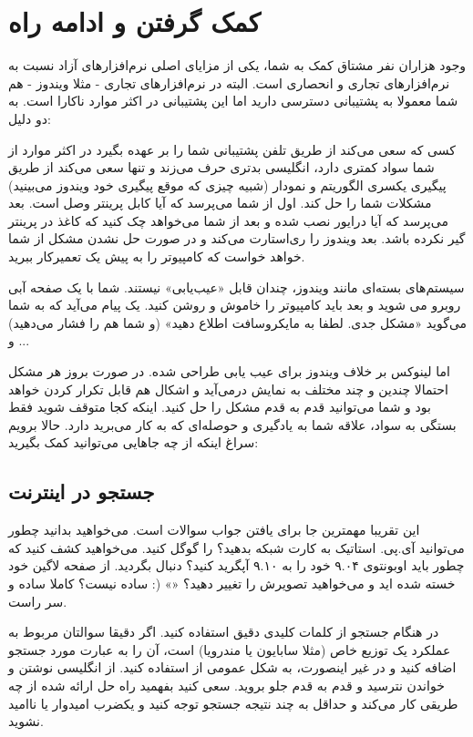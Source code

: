 \section{کمک گرفتن و ادامه راه}
وجود هزاران نفر مشتاق کمک به شما، یکی از مزایای اصلی نرم‌افزارهای آزاد نسبت به نرم‌افزارهای تجاری و انحصاری است. البته در نرم‌افزارهای تجاری - مثلا ویندوز - هم شما معمولا به پشتیبانی دسترسی دارید اما این پشتیبانی در اکثر موارد ناکارا است. به دو دلیل:

کسی که سعی می‌کند از طریق تلفن پشتیبانی شما را بر عهده بگیرد در اکثر موارد از شما سواد کمتری دارد، انگلیسی بدتری حرف می‌زند و تنها سعی می‌کند از طریق پیگیری یکسری الگوریتم و نمودار (شبیه چیزی که موقع پیگیری 
 خود ویندوز می‌بینید) مشکلات شما را حل کند. اول از شما می‌پرسد که آیا کابل پرینتر وصل است. بعد می‌پرسد که آیا درایور نصب شده و بعد از شما می‌خواهد چک کنید که کاغذ در پرینتر گیر نکرده باشد. بعد ویندوز را ری‌استارت می‌کند و در صورت حل نشدن مشکل از شما خواهد خواست که کامپیوتر را به پیش یک تعمیرکار ببرید.

سیستم‌های بسته‌ای مانند ویندوز، چندان قابل «عیب‌یابی» نیستند. شما با یک صفحه آبی روبرو می شوید و بعد باید کامپیوتر را خاموش و روشن کنید. یک پیام می‌آید که به شما می‌گوید «مشکل جدی. لطفا به مایکروسافت اطلاع دهید» (و شما هم 
را فشار می‌دهید) و ...

اما لینوکس بر خلاف ویندوز برای عیب یابی طراحی شده. در صورت بروز هر مشکل احتمالا چندین و چند 
مختلف به نمایش درمی‌آید و اشکال هم قابل تکرار کردن خواهد بود و شما می‌توانید قدم به قدم مشکل را حل کنید. اینکه کجا متوقف شوید فقط بستگی به سواد، علاقه شما به یادگیری و حوصله‌ای که به کار می‌برید دارد.
حالا برویم سراغ اینکه از چه جاهایی می‌توانید کمک بگیرید:
\subsection*{جستجو در اینترنت}
این تقریبا مهمترین جا برای یافتن جواب سوالات است. می‌خواهید بدانید چطور می‌توانید آی.پی. استاتیک به کارت شبکه بدهید؟ 
را گوگل کنید. می‌خواهید کشف کنید که چطور باید اوبونتوی ۹.۰۴ خود را به ۹.۱۰ آپگرید کنید؟ دنبال 
 بگردید. از صفحه لاگین خود خسته شده اید و می‌خواهید تصویرش را تغییر دهید؟ «» (: ساده نیست؟ کاملا ساده و سر راست.

در هنگام جستجو از کلمات کلیدی دقیق استفاده کنید. اگر دقیقا سوالتان مربوط به عملکرد یک توزیع خاص (مثلا سابایون یا مندرویا) است، آن را به عبارت مورد جستجو اضافه کنید و در غیر اینصورت، به شکل عمومی از 
استفاده کنید. از انگلیسی نوشتن و خواندن نترسید و قدم به قدم جلو بروید. سعی کنید بفهمید راه حل ارائه شده از چه طریقی کار می‌کند و حداقل به چند نتیجه جستجو توجه کنید و یکضرب امیدوار یا ناامید نشوید.
